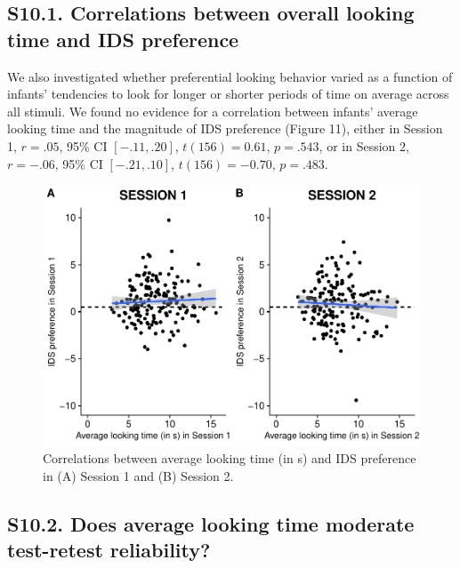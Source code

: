 \documentclass[
  english,
  man, donotrepeattitle,floatsintext]{apa6}
\begin{document}
\hypertarget{s10.1.-correlations-between-overall-looking-time-and-ids-preference}{%
\subsection{S10.1. Correlations between overall looking time and IDS preference}\label{s10.1.-correlations-between-overall-looking-time-and-ids-preference}}

We also investigated whether preferential looking behavior varied as a function of infants' tendencies to look for longer or shorter periods of time on average across all stimuli. We found no evidence for a correlation between infants' average looking time and the magnitude of IDS preference (Figure 11), either in Session 1, \(r = .05\), 95\% CI \([-.11, .20]\), \(t(156) = 0.61\), \(p = .543\), or in Session 2, \(r = -.06\), 95\% CI \([-.21, .10]\), \(t(156) = -0.70\), \(p = .483\).

\begin{figure}

{\centering \includegraphics{MB1T_supplement_files/figure-latex/fig11-1} 

}

\caption{Correlations between average looking time (in s) and IDS preference in (A) Session 1 and (B) Session 2.}\label{fig:fig11}
\end{figure}

\hypertarget{s10.2.-does-average-looking-time-moderate-test-retest-reliability}{%
\subsection{S10.2. Does average looking time moderate test-retest reliability?}\label{s10.2.-does-average-looking-time-moderate-test-retest-reliability}}
\end{document}
